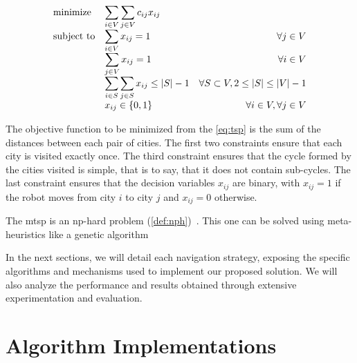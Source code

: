 \begin{equation}
	\label{eq:tsp}
	\begin{array}{ll@{}rr}
		\text{minimize} &
		\displaystyle\sum\limits_{i \in V} \sum\limits_{j \in V} c_{ij} x_{ij} &
		&
		\\
		\text{subject to} &
		\displaystyle\sum\limits_{i \in V} x_{ij} = 1 &
		&
		\forall j \in V \\
		&
		\displaystyle\sum\limits_{j \in V} x_{ij} = 1 &
		&
		\forall i \in V \\
		&
		\displaystyle\sum\limits_{i \in S} \sum\limits_{j \in S} x_{ij} \leq |S| - 1 &
		&
		\forall S \subset V, 2 \leq |S| \leq |V| - 1 \\
		&
		x_{ij} \in \{0, 1\} &
		&
		\forall i \in V, \forall j \in V \\
	\end{array}
\end{equation}

The objective function to be minimized from the \ref{eq:tsp} is the sum of the distances between each pair of cities.
The first two constraints ensure that each city is visited exactly once.
The third constraint ensures that the cycle formed by the cities visited is simple, that is to say, that it does not contain sub-cycles.
The last constraint ensures that the decision variables $x_{ij}$ are binary, with $x_{ij} = 1$ if the robot moves from city $i$ to city $j$ and $x_{ij} = 0$ otherwise.

The \gls{mtsp} is an \gls{np}-hard problem (\ref{def:nph})~\cite{SUNDAR201639}.
This one can be solved using meta-heuristics like a genetic algorithm~\cite{SinghMTSP, Kiraly2011}

In the next sections, we will detail each navigation strategy, exposing the specific algorithms and mechanisms used to implement our proposed solution. We will also analyze the performance and results obtained through extensive experimentation and evaluation.

\section{Algorithm Implementations}

